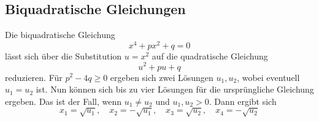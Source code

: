 \subsection{Biquadratische Gleichungen}%
Die biquadratische Gleichung
\begin{equation}
x^4+px^2+q = 0
\end{equation}
lässt sich über die Substitution $u=x^2$ auf die quadratische Gleichung
\begin{equation}
u^2+pu+q
\end{equation}
reduzieren. Für $p^2-4q\ge 0$ ergeben sich zwei Lösungen $u_1,u_2$,
wobei eventuell $u_1=u_2$ ist. Nun können sich bis zu vier Lösungen
für die ursprüngliche Gleichung ergeben. Das ist der Fall,
wenn $u_1\ne u_2$ und $u_1,u_2>0$. Dann
ergibt sich
\begin{equation}
x_1=\sqrt{u_1},\quad x_2=-\sqrt{u_1},\quad
x_3=\sqrt{u_2},\quad x_4=-\sqrt{u_2}
\end{equation}

